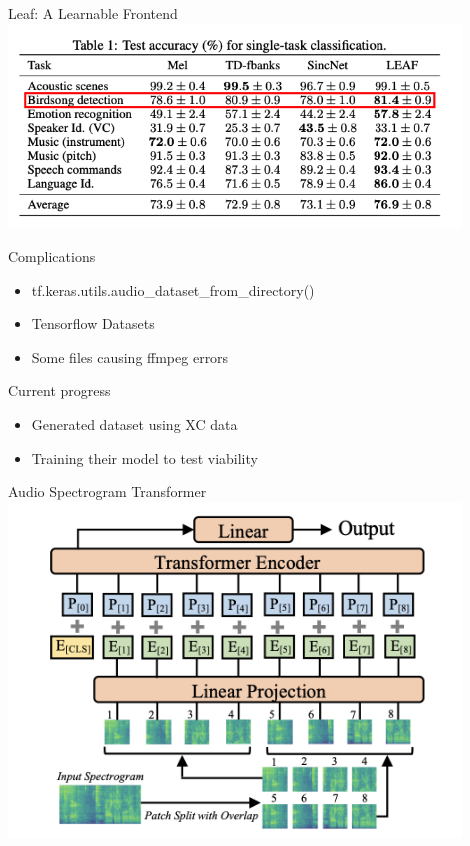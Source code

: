\begin{frame}{Leaf: A Learnable Frontend}
    \centering
    \includegraphics[height=0.7\textheight,width=0.9\textwidth,keepaspectratio]{images/leaf_results_paper.png}
\end{frame}

\begin{frame}{Complications}
    \begin{itemize}
        \item tf.keras.utils.audio\_dataset\_from\_directory()
        \item Tensorflow Datasets
        \item Some files causing ffmpeg errors
    \end{itemize}
\end{frame}

\begin{frame}{Current progress}
    \begin{itemize}
        \item Generated dataset using XC data
        \item Training their model to test viability
    \end{itemize}
\end{frame}


\begin{frame}{Audio Spectrogram Transformer}
    \centering
    \includegraphics[height=0.7\textheight,width=0.9\textwidth,keepaspectratio]{images/ast.png}
\end{frame}

